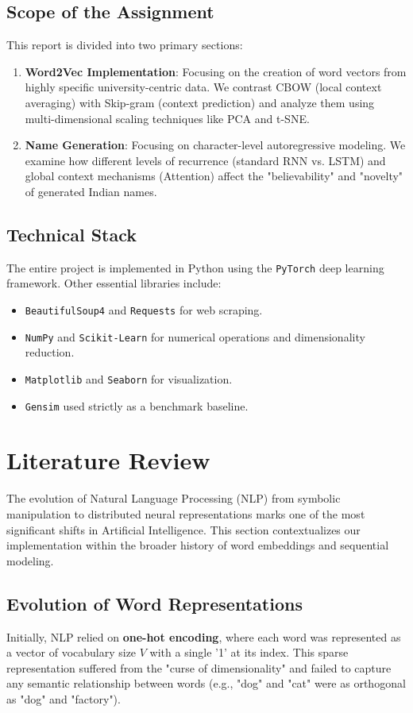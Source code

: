 \documentclass[12pt,a4paper]{article}
\begin{document}
\subsection{Scope of the Assignment}
This report is divided into two primary sections:
\begin{enumerate}[label=\textbf{Part \arabic*:}]
    \item \textbf{Word2Vec Implementation}: Focusing on the creation of word vectors from highly specific university-centric data. We contrast CBOW (local context averaging) with Skip-gram (context prediction) and analyze them using multi-dimensional scaling techniques like PCA and t-SNE.
    \item \textbf{Name Generation}: Focusing on character-level autoregressive modeling. We examine how different levels of recurrence (standard RNN vs. LSTM) and global context mechanisms (Attention) affect the "believability" and "novelty" of generated Indian names.
\end{enumerate}

\subsection{Technical Stack}
The entire project is implemented in Python using the \texttt{PyTorch} deep learning framework. Other essential libraries include:
\begin{itemize}
    \item \texttt{BeautifulSoup4} and \texttt{Requests} for web scraping.
    \item \texttt{NumPy} and \texttt{Scikit-Learn} for numerical operations and dimensionality reduction.
    \item \texttt{Matplotlib} and \texttt{Seaborn} for visualization.
    \item \texttt{Gensim} used strictly as a benchmark baseline.
\end{itemize}

\section{Literature Review}
The evolution of Natural Language Processing (NLP) from symbolic manipulation to distributed neural representations marks one of the most significant shifts in Artificial Intelligence. This section contextualizes our implementation within the broader history of word embeddings and sequential modeling.

\subsection{Evolution of Word Representations}
Initially, NLP relied on \textbf{one-hot encoding}, where each word was represented as a vector of vocabulary size $V$ with a single '1' at its index. This sparse representation suffered from the "curse of dimensionality" and failed to capture any semantic relationship between words (e.g., "dog" and "cat" were as orthogonal as "dog" and "factory").
\end{document}
